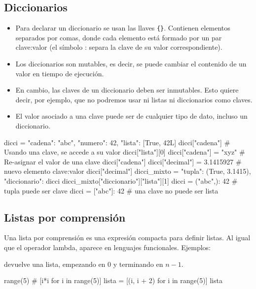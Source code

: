 \subsection{Diccionarios}
\begin{itemize}
\item    Para declarar un diccionario se usan las llaves \verb~{}~. Contienen elementos separados por comas, donde cada elemento está formado por un par clave:valor (el símbolo : separa la clave de su valor correspondiente).
 \item   Los diccionarios son mutables, es decir, se puede cambiar el contenido de un valor en tiempo de ejecución.
\item    En cambio, las claves de un diccionario deben ser inmutables. Esto quiere decir, por ejemplo, que no podremos usar ni listas ni diccionarios como claves.
\item    El valor asociado a una clave puede ser de cualquier tipo de dato, incluso un diccionario.

\end{itemize}






\begin{pyconsole}
dicci = {"cadena": "abc", "numero": 42, "lista": [True, 42L]}
dicci["cadena"] # Usando una clave, se accede a su valor
dicci["lista"][0]
dicci["cadena"] = "xyz" # Re-asignar el valor de una clave
dicci["cadena"]
dicci["decimal"] = 3.1415927 # nuevo elemento clave:valor
dicci["decimal"]
dicci_mixto = {"tupla": (True, 3.1415), "diccionario": dicci}
dicci_mixto["diccionario"]["lista"][1]
dicci = {("abc",): 42} # tupla puede ser clave 
dicci = {["abc"]: 42} # una clave no puede ser lista
\end{pyconsole}



\subsection{Listas por comprensión}
Una lista por comprensión es una expresión compacta para definir listas. Al igual que el operador lambda, aparece en lenguajes funcionales. Ejemplos:

 devuelve una lista, empezando en 0 y terminando en $n-1$.

\begin{pyconsole}
range(5) #  
[i*i for i in range(5)]
lista = [(i, i + 2) for i in range(5)]
lista
\end{pyconsole}



